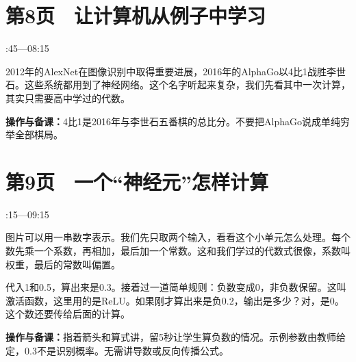 \documentclass[UTF8,a4paper,11pt,fontset=fandol]{ctexart}
\newcommand{\tip}[1]{\par{\small\color{black!65}\noindent\textbf{操作与备课：}#1\par}}
\begin{document}
\par\noindent\begin{minipage}{\linewidth}

\section*{第8页　让计算机从例子中学习}

{\small{}:45—08:15\par}

2012年的AlexNet在图像识别中取得重要进展，2016年的AlphaGo以4比1战胜李世石。这些系统都用到了神经网络。这个名字听起来复杂，我们先看其中一次计算，其实只需要高中学过的代数。

\tip{4比1是2016年与李世石五番棋的总比分。不要把AlphaGo说成单纯穷举全部棋局。}

\end{minipage}\par\vspace{2mm}

\par\noindent\begin{minipage}{\linewidth}

\section*{第9页　一个“神经元”怎样计算}

{\small{}:15—09:15\par}

图片可以用一串数字表示。我们先只取两个输入，看看这个小单元怎么处理。每个数先乘一个系数，再相加，最后加一个常数。这和我们学过的代数式很像，系数叫权重，最后的常数叫偏置。

代入1和0.5，算出来是0.3。接着过一道简单规则：负数变成0，非负数保留。这叫激活函数，这里用的是ReLU。如果刚才算出来是负0.2，输出是多少？对，是0。这个数还要传给后面的计算。

\tip{指着箭头和算式讲，留5秒让学生算负数的情况。示例参数由教师给定，0.3不是识别概率。无需讲导数或反向传播公式。}

\end{minipage}\par\vspace{2mm}
\end{document}

